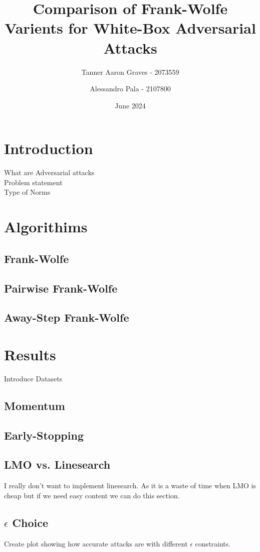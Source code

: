 \documentclass{article}
\title{Comparison of Frank-Wolfe Varients for White-Box Adversarial Attacks}
\author{Tanner Aaron Graves - 2073559\and Alessandro Pala - 2107800}
\date{June 2024}
\begin{document}
\maketitle

\section{Introduction}
What are Adversarial attacks\\
Problem statement\\
Type of Norms

\section{Algorithims}
\subsection{Frank-Wolfe}

\subsection{Pairwise Frank-Wolfe}
\subsection{Away-Step Frank-Wolfe}
\section{Results}
Introduce Datasets
\subsection{Momentum}
\subsection{Early-Stopping}
\subsection{LMO vs. Linesearch}
I really don't want to implement linesearch. As it is a waste of time when LMO is cheap but if we need easy content we can do this section.
\subsection{$\epsilon$ Choice}
Create plot showing how accurate attacks are with different $\epsilon$ constraints.
\end{document}
